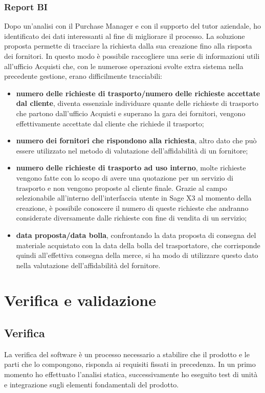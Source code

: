 \subsubsection{Report BI}
Dopo un'analisi con il Purchase Manager e con il supporto del tutor aziendale, ho identificato dei dati interessanti al fine di migliorare il processo.
La soluzione proposta permette di tracciare la richiesta dalla sua creazione fino alla risposta dei fornitori. In questo modo è possibile raccogliere una serie di informazioni utili all'ufficio Acquisti che, con le numerose operazioni svolte extra sistema nella precedente gestione, erano difficilmente tracciabili:
\begin{itemize}
	\item \textbf{numero delle richieste di trasporto/numero delle richieste accettate dal cliente}, diventa essenziale individuare quante delle richieste di trasporto che partono dall'ufficio Acquisti e superano la gara dei fornitori, vengono effettivamente accettate dal cliente che richiede il trasporto;
	\item \textbf{numero dei fornitori che rispondono alla richiesta}, altro dato che può essere utilizzato nel metodo di valutazione dell'affidabilità di un fornitore;
	\item \textbf{numero delle richieste di trasporto ad uso interno}, molte richieste vengono fatte con lo scopo di avere una quotazione per un servizio di trasporto e non vengono proposte al cliente finale. Grazie al campo selezionabile all'interno dell'interfaccia utente in Sage X3  al momento della creazione, è possibile conoscere il numero di queste richieste che andranno considerate diversamente dalle richieste con fine di vendita di un servizio;
	\item \textbf{data proposta/data bolla}, confrontando la data proposta di consegna del materiale acquistato con la data della bolla del trasportatore, che corrisponde quindi all'effettiva consegna della merce, si ha modo di utilizzare questo dato nella valutazione dell'affidabilità del fornitore.
\end{itemize}





\section{Verifica e validazione}

\subsection{Verifica}
La verifica del software è un processo necessario a stabilire che il prodotto e le parti che lo compongono, risponda ai requisiti fissati in precedenza.
In un primo momento ho effettuato l'analisi statica, successivamente ho eseguito test di unità e integrazione sugli elementi fondamentali del prodotto.


